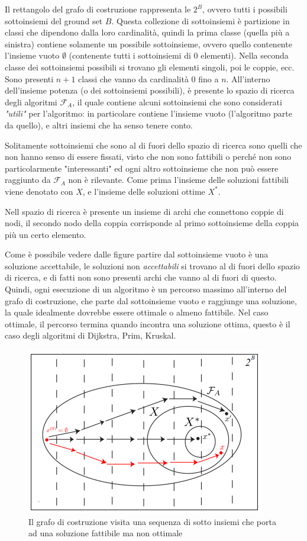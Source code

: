 \documentclass{article}
\begin{document}
Il rettangolo del grafo di costruzione rappresenta le $2^B$, ovvero tutti i possibili
sottoinsiemi del ground set $B$. Questa collezione di sottoinsiemi
è partizione in classi che dipendono dalla loro cardinalità, quindi la prima classe (quella
più a sinistra) contiene solamente un possibile sottoinsieme, ovvero quello contenente l'insieme
vuoto $\emptyset$ (contenente tutti i sottoinsiemi di $0$ elementi). Nella seconda classe
dei sottoinsiemi possibili si trovano gli elementi singoli, poi le coppie, ecc. Sono
presenti $n+1$ classi che vanno da cardinalità $0$ fino a $n$. All'interno dell'insieme
potenza (o dei sottoinsiemi possibili), è presente lo spazio di ricerca degli algoritmi $\mathcal{F}_A$,
il quale contiene alcuni sottoinsiemi che sono considerati \textit{"utili"} per l'algoritmo: in
particolare contiene l'insieme vuoto (l'algoritmo parte da quello), e altri insiemi che ha senso
tenere conto.

Solitamente sottoinsiemi che sono al di fuori dello spazio di ricerca sono quelli che non hanno senso di
essere fissati, visto che non sono fattibili o perché non sono particolarmente "interessanti" ed
ogni altro sottoinsieme che non può essere raggiunto da $\mathcal{F}_A$ non è rilevante. Come prima
l'insieme delle soluzioni fattibili viene denotato con $X$, e l'insieme delle soluzioni ottime $X^*$.

Nell spazio di ricerca è presente un insieme di archi che connettono coppie di nodi, il secondo nodo
della coppia corrisponde al primo sottoinsieme della coppia più un certo elemento.

Come è possibile vedere dalle figure partire dal sottoinsieme vuoto è una soluzione accettabile,
le soluzioni non \textit{accettabili} si trovano al di fuori dello spazio di ricerca, e di fatti
non sono presenti archi che vanno al di fuori di questo. Quindi, ogni esecuzione di un algoritmo è un
percorso massimo all'interno del grafo di costruzione, che parte dal sottoinsieme vuoto e raggiunge
una soluzione, la quale idealmente dovrebbe essere ottimale o almeno fattibile. Nel caso ottimale,
il percorso termina quando incontra una soluzione ottima, questo è il caso degli
algoritmi di Dijkstra, Prim, Kruskal.
\begin{figure}[H]
    \centering
    \includegraphics[scale=0.8]{images/cons_graph_1.png}
    \caption{Il grafo di costruzione visita una sequenza di sotto insiemi che porta ad una soluzione
        fattibile ma non ottimale}
\end{figure}
\end{document}
